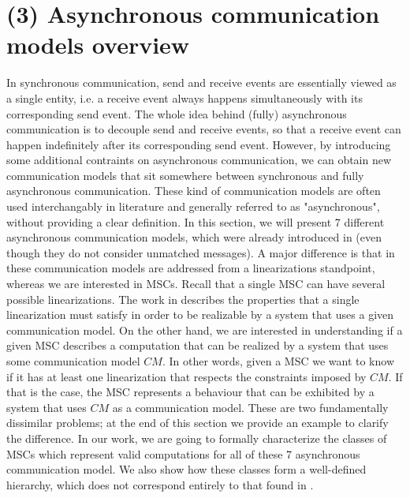 \section{(3) Asynchronous communication models overview}

In synchronous communication, send and receive events are essentially viewed as a single entity, i.e. a receive event always happens simultaneously with its corresponding send event. The whole idea behind (fully) asynchronous communication is to decouple send and receive events, so that a receive event can happen indefinitely after its corresponding send event. However, by introducing some additional contraints on asynchronous communication, we can obtain new communication models that sit somewhere between synchronous and fully asynchronous communication. These kind of communication models are often used interchangably in literature and generally referred to as "asynchronous", without providing a clear definition. In this section, we will present 7 different asynchronous communication models, which were already introduced in \cite{DBLP:journals/fac/ChevrouHQ16} (even though they do not consider unmatched messages). A major difference is that in \cite{DBLP:journals/fac/ChevrouHQ16} these communication models are addressed from a linearizations standpoint, whereas we are interested in MSCs. Recall that a single MSC can have several possible linearizations. The work in \cite{DBLP:journals/fac/ChevrouHQ16} describes the properties that a single linearization must satisfy in order to be realizable by a system that uses a given communication model. On the other hand, we are interested in understanding if a given MSC describes a computation that can be realized by a system that uses some communication model $CM$. In other words, given a MSC we want to know if it has at least one linearization that respects the constraints imposed by $CM$. If that is the case, the MSC represents a behaviour that can be exhibited by a system that uses $CM$ as a communication model. These are two fundamentally dissimilar problems; at the end of this section we provide an example to clarify the difference. In our work, we are going to formally characterize the classes of MSCs which represent valid computations for all of these 7 asynchronous communication model. We also show how these classes form a well-defined hierarchy, which does not correspond entirely to that found in \cite{DBLP:journals/fac/ChevrouHQ16}.

